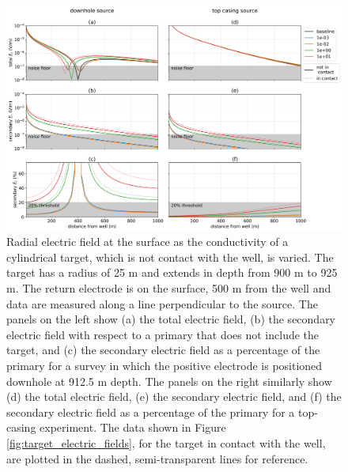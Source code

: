\begin{figure}
    \begin{center}
    \includegraphics[width=\textwidth]{figures/dc_casing/offset_electric_fields.png}
    \end{center}
\caption{
    Radial electric field at the surface as the conductivity of a cylindrical target, which is not contact with the well,
    is varied. The target has a radius of 25 m and extends in depth from 900 m to 925 m. The return electrode
    is on the surface, 500 m from the well and data are measured along a line perpendicular to the source.
    The panels on the left show
    (a) the total electric field, (b) the secondary electric field with respect to a primary that does not include the target,
    and (c) the secondary electric field as a percentage of the primary for a survey in which the positive electrode is
    positioned downhole at 912.5 m depth. The panels on the right similarly show (d) the total electric field, (e) the
    secondary electric field, and (f) the secondary electric field as a percentage of the primary for a top-casing experiment.
    The data shown in Figure \ref{fig:target_electric_fields}, for the target in contact with the well,
    are plotted in the dashed, semi-transparent lines for reference.
}
\label{fig:offset_electric_fields}
\end{figure}
